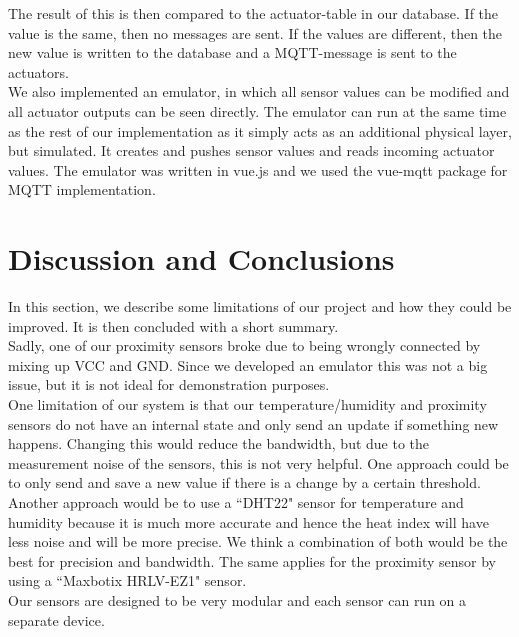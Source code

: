 \documentclass[runningheads]{llncs}
\begin{document}
	The result of this is then compared to the actuator-table in our database. 
	If the value is the same, then no messages are sent. 
	If the values are different, then the new value is written to the database and a MQTT-message is sent to the actuators.
	\\ \linebreak
	We also implemented an emulator, in which all sensor values can be modified and all actuator outputs can be seen directly. 
	The emulator can run at the same time as the rest of our implementation as it simply acts as an additional physical layer, but simulated. 
	It creates and pushes sensor values and reads incoming actuator values. 
	The emulator was written in vue.js \cite{vue} and we used the vue-mqtt \cite{vue-mqtt} package for MQTT implementation.
	
	
	\section{Discussion and Conclusions}
	In this section, we describe some limitations of our project and how they could be improved. 
	It is then concluded with a short summary. 
	\\ \linebreak
	Sadly, one of our proximity sensors broke due to being wrongly connected by mixing up VCC and GND. 
	Since we developed an emulator this was not a big issue, but it is not ideal for demonstration purposes.
	\\ \linebreak
	One limitation of our system is that our temperature/humidity and proximity sensors do not have an internal state and only send an update if something new happens.
	Changing this would reduce the bandwidth, but due to the measurement noise of the sensors, this is not very helpful. 
	One approach could be to only send and save a new value if there is a change by a certain threshold. 
	Another approach would be to use a ``DHT22" sensor for temperature and humidity because it is much more accurate and hence the heat index will have less noise and will be more precise. 
	We think a combination of both would be the best for precision and bandwidth. 
	The same applies for the proximity sensor by using a ``Maxbotix HRLV-EZ1" sensor. 
	\\ \linebreak
	Our sensors are designed to be very modular and each sensor can run on a separate device. 
\end{document}
